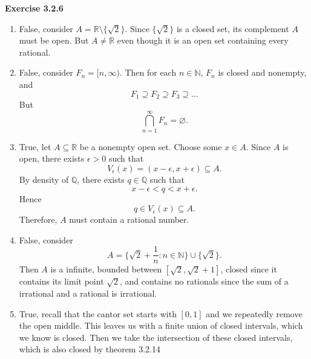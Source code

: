 \documentclass[12pt]{article}
\begin{document}
\textbf{Exercise 3.2.6}
\begin{enumerate}[label=(\alph*)]
    \item False, consider \( A = \mathbb{R} \setminus \{\sqrt{2}\} \).
          Since \( \{\sqrt{2}\} \) is a closed set, its complement \( A \) must be open.
          But \( A \neq \mathbb{R} \) even though it is an open set containing every rational.

    \item False, consider \( F_n = [n, \infty ) \).
          Then for each \( n \in \mathbb{N} \), \( F_n \) is closed and nonempty, and
          \[
              F_1 \supseteq  F_2 \supseteq  F_3 \supseteq  \dots
          \]
          But
          \[
              \bigcap_{n=1}^{\infty} F_n = \varnothing.
          \]

    \item True, let \( A \subseteq \mathbb{R} \) be a nonempty open set.
          Choose some \( x \in A \).
          Since \(A \) is open, there exists \( \epsilon > 0 \) such that
          \[
              V_{\epsilon}(x) = (x-\epsilon, x+\epsilon) \subseteq A.
          \]
          By density of \( \mathbb{Q} \), there exists \( q \in \mathbb{Q} \) such that
          \[
              x - \epsilon < q < x + \epsilon.
          \]
          Hence
          \[
              q \in V_{\epsilon}(x) \subseteq A.
          \]
          Therefore, \( A \) must contain a rational number.


    \item False, consider
          \[
              A = \{\sqrt{2} + \frac{1}{n} : n \in \mathbb{N} \} \cup  \{\sqrt{2}\}.
          \]
          Then \( A \) is a infinite, bounded between \( [\sqrt{2}, \sqrt{2} + 1] \),
          closed since it contains its limit point \( \sqrt{2} \), and contains no rationals
          since the sum of a irrational and a rational is irrational.


    \item True, recall that the cantor set starts with \( [0,1] \) and we repeatedly
          remove the open middle.
          This leaves us with a finite union of closed intervals, which we know is closed.
          Then we take the intersection of these closed intervals, which is also closed by theorem 3.2.14

\end{enumerate}
\end{document}
